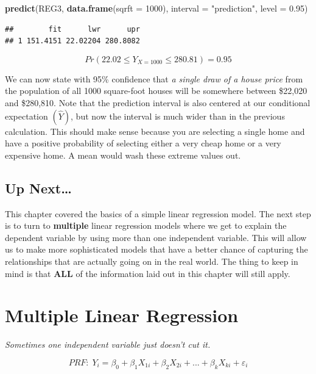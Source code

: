 \documentclass[
]{book}
\newenvironment{Shaded}{\begin{snugshade}}{\end{snugshade}}
\newcommand{\AttributeTok}[1]{\textcolor[rgb]{0.13,0.29,0.53}{#1}}
\newcommand{\DecValTok}[1]{\textcolor[rgb]{0.00,0.00,0.81}{#1}}
\newcommand{\FloatTok}[1]{\textcolor[rgb]{0.00,0.00,0.81}{#1}}
\newcommand{\FunctionTok}[1]{\textcolor[rgb]{0.13,0.29,0.53}{\textbf{#1}}}
\newcommand{\NormalTok}[1]{#1}
\newcommand{\StringTok}[1]{\textcolor[rgb]{0.31,0.60,0.02}{#1}}
\begin{document}
\begin{Shaded}
\begin{Highlighting}[]
\FunctionTok{predict}\NormalTok{(REG3,}
        \FunctionTok{data.frame}\NormalTok{(}\AttributeTok{sqrft =} \DecValTok{1000}\NormalTok{), }
        \AttributeTok{interval =} \StringTok{"prediction"}\NormalTok{,}
        \AttributeTok{level =} \FloatTok{0.95}\NormalTok{)}
\end{Highlighting}
\end{Shaded}

\begin{verbatim}
##        fit      lwr      upr
## 1 151.4151 22.02204 280.8082
\end{verbatim}

\[Pr(22.02\leq Y_{X=1000} \leq 280.81)=0.95\]

We can now state with 95\% confidence that \emph{a single draw of a house price} from the population of all 1000 square-foot houses will be somewhere between \$22,020 and \$280,810. Note that the prediction interval is also centered at our conditional expectation \((\hat{Y})\), but now the interval is much wider than in the previous calculation. This should make sense because you are selecting a single home and have a positive probability of selecting either a very cheap home or a very expensive home. A mean would wash these extreme values out.

\section{Up Next\ldots{}}\label{up-next}

This chapter covered the basics of a simple linear regression model. The next step is to turn to \textbf{multiple} linear regression models where we get to explain the dependent variable by using more than one independent variable. This will allow us to make more sophisticated models that have a better chance of capturing the relationships that are actually going on in the real world. The thing to keep in mind is that \textbf{ALL} of the information laid out in this chapter will still apply.

\chapter{Multiple Linear Regression}\label{MLR}

\emph{Sometimes one independent variable just doesn't cut it.}

\[PRF:\;Y_i=\beta_0+\beta_1X_{1i}+\beta_2X_{2i}+...+\beta_kX_{ki}+\varepsilon_i\]
\end{document}
